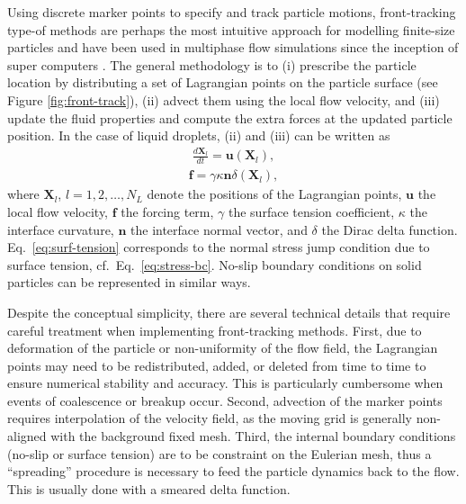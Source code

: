 Using discrete marker points to specify and track particle motions, front-tracking type-of methods are perhaps the most intuitive approach for modelling finite-size particles and have been used in multiphase flow simulations since the inception of super computers \citep{Daly1969, Viecelli_1969, Peskin, Glimm_1982, unverdi_tryggvason_1992a, tryggvason_bunner_esmaeeli_juric_al-rawahi_tauber_han_nas_jan_2001a, Pozrikidis_JCP2001, Muradoglu_Tryggvason_2014}.
The general methodology is to
(i) prescribe the particle location by distributing a set of Lagrangian points on the particle surface (see Figure \ref{fig:front-track}),
(ii) advect them using the local flow velocity, and
(iii) update the fluid properties and compute the extra forces at the updated particle position.
In the case of liquid droplets, (ii) and (iii) can be written as
\begin{equation} \label{eq:lagrangian}
 \begin{aligned}
   \frac{d \bm{X}_l}{dt} = \bm{u}(\bm{X}_l),
 \end{aligned}
\end{equation}
\begin{equation} \label{eq:surf-tension}
 \begin{aligned}
   \bm{f} = \gamma \kappa \bm{n} \delta (\bm{X}_l) ,
 \end{aligned}
\end{equation}
where $\bm{X}_l$, $l=1,2,\dots,N_L$ denote the positions of the Lagrangian points, $\bm u$ the local flow velocity, $\bm f$ the forcing term, $\gamma$ the surface tension coefficient, $\kappa$ the interface curvature, $\bm n$ the interface normal vector, and $\delta$ the Dirac delta function. Eq.\ \eqref{eq:surf-tension} corresponds to the normal stress jump condition due to surface tension, cf.\ Eq.\ \eqref{eq:stress-bc}. No-slip boundary conditions on solid particles can be represented in similar ways.

Despite the conceptual simplicity, there are several technical details that require careful treatment when implementing front-tracking methods.
First, due to deformation of the particle or non-uniformity of the flow field, the Lagrangian points may need to be redistributed, added, or deleted from time to time to ensure numerical stability and accuracy.
This is particularly cumbersome when events of coalescence or breakup occur.
Second, advection of the marker points requires interpolation of the velocity field, as the moving grid is generally non-aligned with the background fixed mesh.
Third, the internal boundary conditions (no-slip or surface tension) are to be constraint on the Eulerian mesh, thus a ``spreading'' procedure is necessary to feed the particle dynamics back to the flow. This is usually done with a smeared delta function.

